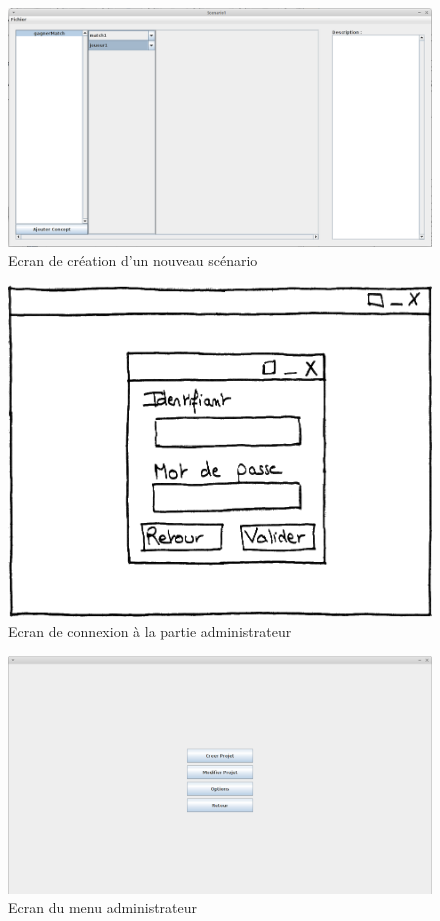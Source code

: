 \documentclass[12pt]{report}
\begin{document}
\begin{figure}
\centering
\includegraphics[scale=0.3]{IHM/remplissage_scenario.png}
\caption{Ecran de création d'un nouveau scénario}
\end{figure}
\begin{figure}
\centering
\includegraphics[scale=0.5]{IHM_5b.png}
\caption{Ecran de connexion à la partie administrateur}
\end{figure}
\begin{figure}
\centering
\includegraphics[scale=0.3]{IHM/selection_projet.png}
\caption{Ecran du menu administrateur}
\end{figure}
\end{document}
